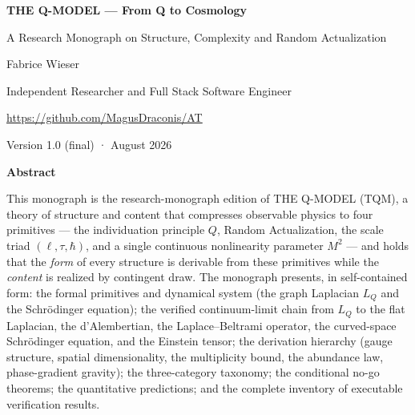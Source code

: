 \documentclass[10pt,twoside,openany]{book}
\begin{document}

\frontmatter

\begin{center}
{\LARGE\bfseries THE Q-MODEL — From Q to Cosmology\par}
\vspace{0.4em}
{\large A Research Monograph on Structure, Complexity and Random Actualization\par}
\vspace{1.0em}
{\normalsize Fabrice Wieser\par}
{\small Independent Researcher and Full Stack Software Engineer\par}
{\small \url{https://github.com/MagusDraconis/AT}\par}
\vspace{0.5em}
{\normalsize Version 1.0 (final) \quad· August 2026\par}
\end{center}

\vspace{0.8em}

{\centering\Large\bfseries Abstract\par}
\vspace{0.3em}
\noindent
This monograph is the research-monograph edition of THE Q-MODEL (TQM), a theory of
structure and content that compresses observable physics to four primitives — the
individuation principle $Q$, Random Actualization, the scale triad $(\ell,\tau,\hbar)$,
and a single continuous nonlinearity parameter $M^2$ — and holds that the \emph{form} of
every structure is derivable from these primitives while the \emph{content} is realized by
contingent draw. The monograph presents, in self-contained form: the formal primitives and
dynamical system (the graph Laplacian $L_Q$ and the Schr\"odinger equation); the verified
continuum-limit chain from $L_Q$ to the flat Laplacian, the d'Alembertian, the
Laplace--Beltrami operator, the curved-space Schr\"odinger equation, and the Einstein
tensor; the derivation hierarchy (gauge structure, spatial dimensionality, the
multiplicity bound, the abundance law, phase-gradient gravity); the three-category
taxonomy; the conditional no-go theorems; the quantitative predictions; and the complete
inventory of executable verification results.
\end{document}
